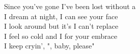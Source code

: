 \songwordfb{~}
Since you've gone I've been lost \songwordfb{~} without a  \\
I dream at night, I can  see your face \songwordfb{~} \\
I look around but it's  I can't replace \songwordfb{~} \\
I feel so cold and I  for your embrace \songwordfb{~} \\
I keep cryin', ", baby, please" \\
